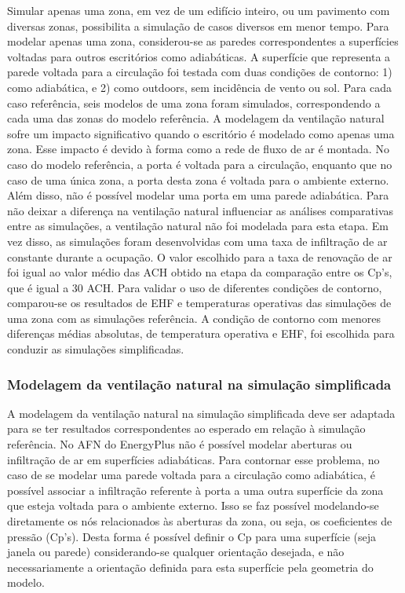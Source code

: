 \documentclass[brazil,hardcopy,openany,a5paper]{ufscthesis}
\begin{document}
		Simular apenas uma zona, em vez de um edifício inteiro, ou um pavimento com diversas zonas, possibilita a simulação de casos diversos em menor tempo.		
		Para modelar apenas uma zona, considerou-se as paredes correspondentes a superfícies voltadas para outros escritórios como adiabáticas. A superfície que representa a parede voltada para a circulação foi testada com duas condições de contorno: 1) como adiabática, e 2) como outdoors, sem incidência de vento ou sol.
		Para cada caso referência, seis modelos de uma zona foram simulados, correspondendo a cada uma das zonas do modelo referência.
		A modelagem da ventilação natural sofre um impacto significativo quando o escritório é modelado como apenas uma zona.
		Esse impacto é devido à forma como a rede de fluxo de ar é montada. No caso do modelo referência, a porta é voltada para a circulação, enquanto que no caso de uma única zona, a porta desta zona é voltada para o ambiente externo. 
		Além disso, não é possível modelar uma porta em uma parede adiabática. Para não deixar a diferença na ventilação natural influenciar as análises comparativas entre as simulações, a ventilação natural não foi modelada para esta etapa.
		Em vez disso, as simulações foram desenvolvidas com uma taxa de infiltração de ar constante durante a ocupação. O valor escolhido para a taxa de renovação de ar foi igual ao valor médio das ACH obtido na etapa da comparação entre os Cp's, que é igual a 30 ACH.
		Para validar o uso de diferentes condições de contorno, comparou-se os resultados de EHF e temperaturas operativas das simulações de uma zona com as simulações referência.
		A condição de contorno com menores diferenças médias absolutas, de temperatura operativa e EHF, foi escolhida para conduzir as simulações simplificadas.
		
		\subsubsection{Modelagem da ventilação natural na simulação simplificada}
		
		A modelagem da ventilação natural na simulação simplificada deve ser adaptada para se ter resultados correspondentes ao esperado em relação à simulação referência.		
		No AFN do EnergyPlus não é possível modelar aberturas ou infiltração de ar em superfícies adiabáticas. Para contornar esse problema, no caso de se modelar uma parede voltada para a circulação como adiabática, é possível associar a infiltração referente à porta a uma outra superfície da zona que esteja voltada para o ambiente externo. Isso se faz possível modelando-se diretamente os nós relacionados às aberturas da zona, ou seja, os coeficientes de pressão (Cp's). Desta forma é possível definir o Cp para uma superfície (seja janela ou parede) considerando-se qualquer orientação desejada, e não necessariamente a orientação definida para esta superfície pela geometria do modelo.
		
\end{document}
